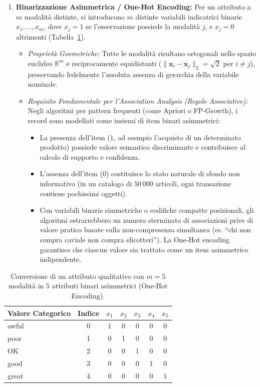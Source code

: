 \begin{enumerate}
    \item \textbf{Binarizzazione Asimmetrica / One-Hot Encoding:}
    Per un attributo a $m$ modalità distinte, si introducono $m$ distinte variabili indicatrici binarie $x_1, \dots, x_m$, dove $x_j = 1$ se l'osservazione possiede la modalità $j$, e $x_j = 0$ altrimenti (Tabella~\ref{tab:binarization-example}).
    \begin{itemize}
        \item \textit{Proprietà Geometriche:} Tutte le modalità risultano ortogonali nello spazio euclideo $\mathbb{R}^m$ e reciprocamente equidistanti ($\|\mathbf{x}_i - \mathbf{x}_j\|_2 = \sqrt{2}$ per $i \ne j$), preservando fedelmente l'assoluta assenza di gerarchia della variabile nominale.
        \item \textit{Requisito Fondamentale per l'Association Analysis (Regole Associative):}
        Negli algoritmi per pattern frequenti (come Apriori o FP-Growth), i record sono modellati come insiemi di item binari asimmetrici:
        \begin{itemize}
            \item La presenza dell'item ($1$, ad esempio l'acquisto di un determinato prodotto) possiede valore semantico discriminante e contribuisce al calcolo di supporto e confidenza.
            \item L'assenza dell'item ($0$) costituisce lo stato naturale di sfondo non informativo (in un catalogo di $50\,000$ articoli, ogni transazione contiene pochissimi oggetti).
            \item Con variabili binarie simmetriche o codifiche compatte posizionali, gli algoritmi estrarrebbero un numero sterminato di associazioni prive di valore pratico basate sulla non-compresenza simultanea (es. ``chi non compra caviale non compra elicotteri''). La One-Hot encoding garantisce che ciascun valore sia trattato come un item asimmetrico indipendente.
        \end{itemize}
    \end{itemize}
\end{enumerate}

\begin{table}[H]
\centering
\small
\begin{tabular}{lcccccc}
\toprule
\textbf{Valore Categorico} & \textbf{Indice} & $x_1$ & $x_2$ & $x_3$ & $x_4$ & $x_5$ \\
\midrule
awful  & 0 & 1 & 0 & 0 & 0 & 0 \\
poor   & 1 & 0 & 1 & 0 & 0 & 0 \\
OK     & 2 & 0 & 0 & 1 & 0 & 0 \\
good   & 3 & 0 & 0 & 0 & 1 & 0 \\
great  & 4 & 0 & 0 & 0 & 0 & 1 \\
\bottomrule
\end{tabular}
\caption{Conversione di un attributo qualitativo con $m=5$ modalità in $5$ attributi binari asimmetrici (One-Hot Encoding).}
\label{tab:binarization-example}
\end{table}

